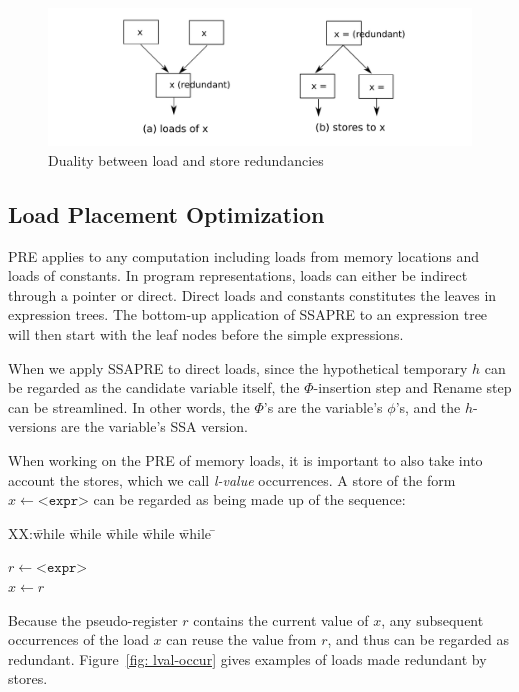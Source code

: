 \begin{figure}
\centering
\includegraphics[scale=0.55]{fig-load-store-dual.pdf}
\caption{Duality between load and store redundancies}
\label{fig: load-store-dual}
\end{figure}

\subsection{Load Placement Optimization}

PRE applies to any computation including loads from memory locations and
loads of constants.  In program representations, loads can either be indirect 
through a pointer or direct.  Direct loads  and constants constitutes the leaves
in expression trees.  The bottom-up application of SSAPRE to an expression
tree will then start with the leaf nodes before the simple expressions.

When we apply SSAPRE to direct loads, since the hypothetical temporary $h$ can
be regarded as the candidate variable itself, the $\Phi$-insertion step and
Rename step can be streamlined.  In other words, the $\Phi$'s are the variable's
$\phi$'s, and the $h$-versions are the variable's SSA version.

When working on the PRE of memory loads, it is important to also take into
account the stores, which we call \emph{l-value} occurrences.  A store of the 
form $x \leftarrow \texttt{<expr>}$ can be regarded as being made up of the
sequence:
\begin{tabbing}
XX:\= while \= while \= while \= while \= while \= \kill

\> \> $r \leftarrow \texttt{<expr>}$ \\
\> \> $x \leftarrow r$ \\
\end{tabbing}
Because the pseudo-register $r$ contains the current value of $x$, any
subsequent occurrences of the load $x$ can reuse the value from $r$, and
thus can be regarded as redundant.   Figure~\ref{fig: lval-occur} gives examples
of loads made redundant by stores.

